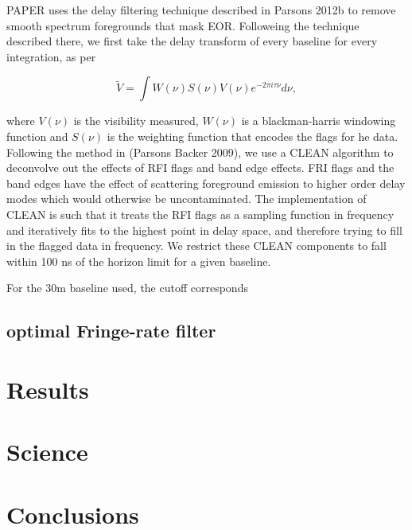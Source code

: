 \documentclass[twocolumn,numberedappendix]{emulateapj}
\begin{document}
PAPER uses the delay filtering technique described in Parsons 2012b to remove
smooth spectrum foregrounds that mask EOR. Followeing the technique
described there, we first take the delay transform of every baseline for every
integration, as per 

\begin{equation}\label{eqn:delay_transform}
    \tilde{V} = \int{W(\nu)S(\nu)V(\nu)e^{-2\pi{i}\tau\nu}d\nu},
\end{equation}

where $V(\nu)$ is the visibility measured, $W(\nu)$ is a blackman-harris
windowing function and $S(\nu)$ is the weighting function that encodes the flags
for he data. Following the method in (Parsons Backer 2009), we use a CLEAN
algorithm to deconvolve out the effects of RFI flags and band edge effects. FRI
flags and the band edges have the effect of scattering foreground emission to
higher order delay modes which would otherwise be uncontaminated. The
implementation of CLEAN is such that it treats the RFI flags as a sampling
function in frequency and iteratively fits to the highest point in delay space,
and therefore trying to fill in the flagged data in frequency. We restrict these
CLEAN components to fall within 100 ns of the horizon limit for a given
baseline. 

For the 30m baseline used, the cutoff corresponds 



\subsection{optimal Fringe-rate filter}
% 


\section{Results}

\section{Science}

\section{Conclusions}




\end{document}
